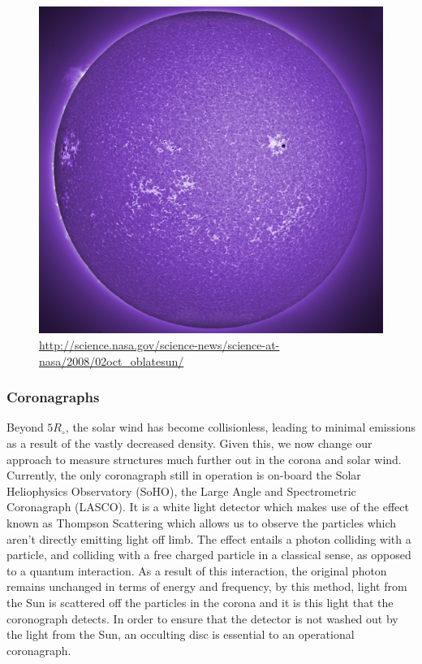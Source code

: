 \begin{figure}
	\includegraphics[width=\linewidth]{Chapter1/Figs/magnetic_network}
	\caption{\url{http://science.nasa.gov/science-news/science-at-nasa/2008/02oct_oblatesun/}}
	\label{fig:mag_network}
\end{figure}


\subsubsection{Coronagraphs}

Beyond $5 R_\circ$, the solar wind has become collisionless, leading to minimal emissions as a result of the vastly decreased density.
Given this, we now change our approach to measure structures much further out in the corona and solar wind.
Currently, the only coronagraph still in operation is on-board the Solar Heliophysics Observatory (SoHO), the Large Angle and Spectrometric Coronagraph (LASCO). 
It is a white light detector which makes use of the effect known as Thompson Scattering which allows us to observe the particles which aren't directly emitting light off limb.
The effect entails a photon colliding with a particle, and colliding with a free charged particle in a classical sense, as opposed to a quantum interaction.
As a result of this interaction, the original photon remains unchanged in terms of energy and frequency, by this method, light from the Sun is scattered off the particles in the corona and it is this light that the coronograph detects.
In order to ensure that the detector is not washed out by the light from the Sun, an occulting disc is essential to an operational coronagraph.


